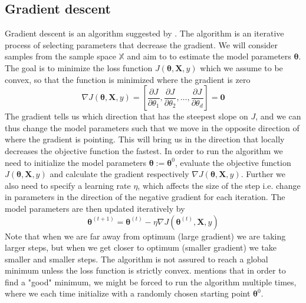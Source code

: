 \subsection{Gradient descent} 
Gradient descent is an algorithm suggested by \cite{Cauchy1847}. The algorithm is an iterative process of selecting parameters that decrease the gradient. We will consider samples from the sample space $\mathbb{X}$ and aim to to estimate the model parameters $\boldsymbol{\theta}$. The goal is to minimize the loss function  $J(\boldsymbol{\theta},\boldsymbol{X},y)$ which we assume to be convex, so that the function is minimized where the gradient is zero
\begin{equation*}
    \nabla J(\boldsymbol{\theta},\boldsymbol{X},y)=\left[\frac{\partial J}{\partial\theta_1},\frac{\partial J}{\partial\theta_2},\ldots,\frac{\partial J}{\partial\theta_d}\right]=\boldsymbol{0}
\end{equation*}
The gradient tells us which direction that has the steepest slope on $J$, and we can thus change the model parameters such that we move in the opposite direction of where the gradient is pointing. This will bring us in the direction that locally decreases the objective function the fastest. In order to run the algorithm we need to initialize the model parameters $\boldsymbol{\theta}:=\boldsymbol{\theta}^0$, evaluate the objective function $J(\boldsymbol{\theta},\boldsymbol{X},y)$ and calculate the gradient respectively $\nabla J(\boldsymbol{\theta},\boldsymbol{X},y)$. Further we also need to specify a learning rate $\eta$, which affects the size of the step i.e. change in parameters in the direction of the negative gradient for each iteration. The model parameters are then updated iteratively by
\begin{equation*}
    \boldsymbol{\theta}^{(t+1)}=\boldsymbol{\theta}^{(t)}-\eta \nabla J(\boldsymbol{\theta}^{(t)},\boldsymbol{X},y)
\end{equation*}
Note that when we are far away from optimum (large gradient) we are taking larger steps, but when we get closer to optimum (smaller gradient) we take smaller and smaller steps. The algorithm is not assured to reach a global minimum unless the loss function is strictly convex. \cite{bishop2007} mentions that in order to find a "good" minimum, we might be forced to run the algorithm multiple times, where we each time initialize with a randomly chosen starting point $\boldsymbol{\theta}^0$. 

